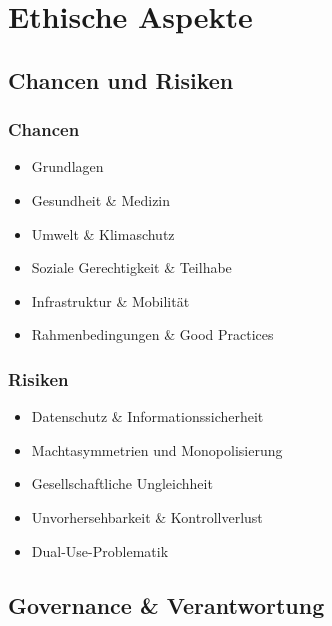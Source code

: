 \chapter{Ethische Aspekte}
\label{ethics} %



\section{Chancen und Risiken}

\subsection{Chancen}

\begin{itemize}
\item Grundlagen
\item Gesundheit \& Medizin
\item Umwelt \& Klimaschutz
\item Soziale Gerechtigkeit \& Teilhabe
\item Infrastruktur \& Mobilität
\item Rahmenbedingungen \& Good Practices
\end{itemize}

\subsection{Risiken}

\begin{itemize}
\item Datenschutz \& Informationssicherheit
\item Machtasymmetrien und Monopolisierung
\item Gesellschaftliche Ungleichheit
\item Unvorhersehbarkeit \& Kontrollverlust
\item Dual-Use-Problematik
\end{itemize}

\section{Governance \& Verantwortung}

